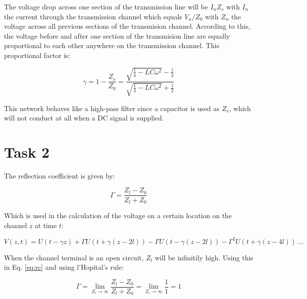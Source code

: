 \documentclass[final]{scrreprt} %
\begin{document}
The voltage drop across one section of the transmission line will be $I_n Z_s$ with $I_n$ the current through the transmission channel which equals $V_n / Z_0$ with $Z_n$ the voltage across all previous sections of the transmision channel. According to this, the voltage before and after one section of the transmision line are equally proportional to each other anywhere on the transmission channel. This proportional factor is:


\begin{equation}
	\gamma = 1 - \frac{Z_s}{Z_0} = \frac{\sqrt{\frac{1}{4} - LC \omega^2} - \frac{1}{2}}{\sqrt{\frac{1}{4} - LC \omega^2} + \frac{1}{2}}
\end{equation}

This network behaves like a high-pass filter since a capacitor is used as $Z_s$, which will not conduct at all when a DC signal is supplied.

\section{Task 2}
The reflection coefficient is given by:

\begin{equation}
	\Gamma = \frac{Z_l - Z_0}{Z_l + Z_0}
\label{eq:rc}
\end{equation}

Which is used in the calculation of the voltage on a certain location on the channel $z$ at time $t$:

\begin{equation}
	V(z,t) = U(t - \gamma z) + \Gamma U(t + \gamma(z - 2l)) - \Gamma U(t - \gamma(z - 2l)) - \Gamma^2 U(t + \gamma(z - 4l)) ~ ...
\label{eq:v}
\end{equation}

When the channel terminal is an open circuit, $Z_l$ will be infinitily high. Using this in Eq. \ref{eq:rc} and using l'Hopital's rule:

\begin{equation}
	\Gamma = \lim_{Z_l \to \infty} \frac{Z_l - Z_0}{Z_l + Z_0} = \lim_{Z_l \to \infty} \frac{1}{1} = 1
\end{equation}
\end{document}
